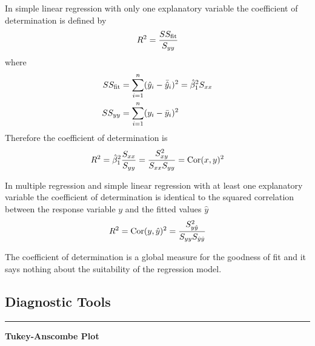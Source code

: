 In simple linear regression with only one explanatory variable the coefficient of determination is defined by
\begin{equation}
  R^2 = \frac{SS_{\textup{fit}}}{S_{yy}}
\end{equation}
where
\begin{equation}
  \begin{split}
    SS_{\textup{fit}} &= \sum_{i=1}^n(\hat{y}_i - \bar{\hat{y}}_i)^2 = \hat{\beta}_1^2 S_{xx}\\
    SS_{yy} &= \sum_{i=1}^n(y_i - \bar{y}_i)^2
  \end{split}
\end{equation}
Therefore the coefficient of determination is
\begin{equation}
  R^2 = \hat{\beta}_1^2 \frac{S_{xx}}{S_{yy}} = \frac{S_{xy}^2}{S_{xx} S_{yy}} = \textup{Cor}(x, y)^2
\end{equation}

In multiple regression and simple linear regression with at least one explanatory variable the coefficient of determination is identical to the squared correlation between the response variable $y$ and the fitted values $\hat{y}$
\begin{equation}
  R^2 = \textup{Cor}(y, \hat{y})^2 = \frac{S_{y\hat{y}}^2}{S_{yy} S_{\hat{y}\hat{y}}}
\end{equation}

The coefficient of determination is a global measure for the goodness of fit and it says nothing about the suitability of the regression model.

\subsection{Diagnostic Tools}
\noindent\rule[\linienAbstand]{\linewidth}{\linienDicke}

\textbf{Tukey-Anscombe Plot}
